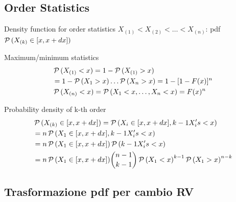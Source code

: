 \documentclass[asd-beamer.tex]{subfiles}
\begin{document}
\subsection{Order Statistics}

\begin{frame}{Density function for order statistics}
	$X_{(1)}<X_{(2)}<\ldots<X_{(n)}$: pdf $\operatorname{\mathcal{P}}{(X_{(k)}\in[x,x+dx])}$
	\begin{block}{Maximum/minimum statistics}
		\begin{align*}
		&\operatorname{\mathcal{P}}{(X_{(1)}<x)}=1-\operatorname{\mathcal{P}}{(X_{(1)}>x)}\\
		&=1-\operatorname{\mathcal{P}}{(X_1>x)}\ldots\operatorname{\mathcal{P}}{(X_n>x)}=1-[1-F(x)]^n\\
		&\operatorname{\mathcal{P}}{(X_{(n)}<x)}=\operatorname{\mathcal{P}}{(X_1<x,\ldots,X_n<x)}=F(x)^n
		\end{align*}
	\end{block}
	\begin{block}{Probability density of k-th order}
		\begin{align*}
		&\operatorname{\mathcal{P}}{(X_{(k)}\in[x,x+dx])}=\operatorname{\mathcal{P}}{(X_i\in[x,x+dx],k-1 X_i's<x)}\\
		&=n\operatorname{\mathcal{P}}{(X_1\in[x,x+dx],k-1 X_i's<x)}\\
		&=n\operatorname{\mathcal{P}}{(X_1\in[x,x+dx])}\operatorname{\mathcal{P}}{(k-1 X_i's<x)}\\
		&=n\operatorname{\mathcal{P}}{(X_1\in[x,x+dx])}\binom{n-1}{k-1}\operatorname{\mathcal{P}}{(X_1<x)}^{k-1}\operatorname{\mathcal{P}}{(X_1>x)}^{n-k}
		\end{align*}
	\end{block}
\end{frame}

\subsection{Trasformazione pdf per cambio RV}
\end{document}
